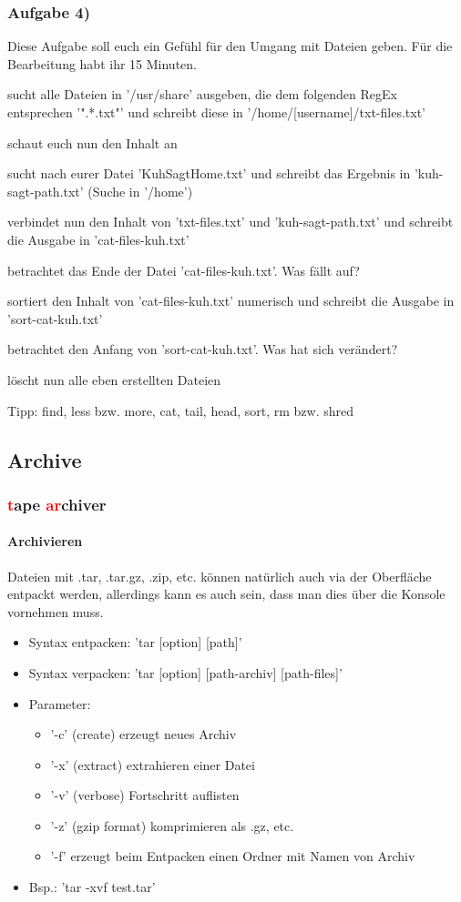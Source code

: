 \documentclass[12pt,utf8]{beamer}
\begin{document}
\begin{frame}
\frametitle{Aufgabe 4)}
Diese Aufgabe soll euch ein Gefühl für den Umgang mit Dateien geben. Für die Bearbeitung habt ihr 15 Minuten.
\begin{itemize}
	{\footnotesize
	\item sucht alle Dateien in '/usr/share' ausgeben, die dem folgenden RegEx entsprechen '".*.txt"' und schreibt diese in '/home/[username]/txt-files.txt'
	\item schaut euch nun den Inhalt an
	\item sucht nach eurer Datei 'KuhSagtHome.txt' und schreibt das Ergebnis in 'kuh-sagt-path.txt' (Suche in '/home')
	\item verbindet nun den Inhalt von 'txt-files.txt' und 'kuh-sagt-path.txt' und schreibt die Ausgabe in 'cat-files-kuh.txt'
	\item betrachtet das Ende der Datei 'cat-files-kuh.txt'. Was fällt auf?
	\item sortiert den Inhalt von 'cat-files-kuh.txt' numerisch und schreibt die Ausgabe in 'sort-cat-kuh.txt'
	\item betrachtet den Anfang von 'sort-cat-kuh.txt'. Was hat sich verändert?
	\item löscht nun alle eben erstellten Dateien
	}
\end{itemize}
{\scriptsize Tipp: find, less bzw. more, cat, tail, head, sort, rm bzw. shred}
\end{frame}


\subsection{Archive}
\begin{frame}
\frametitle{\textcolor{red}{t}ape \textcolor{red}{ar}chiver}
\framesubtitle{\textcolor{ownDarkOr}{Archivieren}}
Dateien mit .tar, .tar.gz, .zip, etc. können natürlich auch via der Oberfläche entpackt werden, allerdings kann es auch sein, dass man dies über die Konsole vornehmen muss.
\begin{itemize}[<+->]
	\item Syntax entpacken: 'tar [option] [path]'
	\item Syntax verpacken: 'tar [option] [path-archiv] [path-files]'
	\item Parameter:
	\begin{itemize}[<+->]
		\item '-c' (create) erzeugt neues Archiv
		\item '-x' (extract) extrahieren einer Datei
		\item '-v' (verbose) Fortschritt auflisten
		\item '-z' (gzip format) komprimieren als .gz, etc.
		\item '-f' erzeugt beim Entpacken einen Ordner mit Namen von Archiv
	\end{itemize}
	\item Bsp.: 'tar -xvf test.tar'
\end{itemize}
\end{frame}
\end{document}
